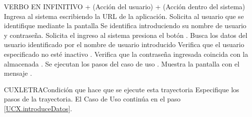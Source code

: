 \begin{UCtrayectoria}
	 VERBO EN INFINITIVO + (Acción del usuario) + (Acción dentro del sistema)
	\UCpaso[\UCactor] Ingresa al sistema escribiendo la URL de la aplicación.
	\UCpaso Solicita al usuario que se identifique mediante la pantalla 
	\UCpaso[\UCactor] \label{UCX.introduceDatos} Se identifica introduciendo su nombre de usuario y contraseña.
	\UCpaso[\UCactor] Solicita el ingreso al sistema presiona el botón .
	\UCpaso Busca los datos del usuario identificado por el nombre de usuario introducido 
	\UCpaso Verifica que el usuario especificado no esté inactivo  .
	\UCpaso Verifica que la contraseña ingresada coincida con la almacenada .
	\UCpaso[] Se ejecutan los pasos del caso de uso .
	\UCpaso Muestra la pantalla  con el mensaje .
\end{UCtrayectoria}


\begin{UCtrayectoriaA}{CUX}{LETRA}{Condición que hace que se ejecute esta trayectoria}
	\UCpaso Especifique los pasos  de la trayectoria.
	\UCpaso[] El Caso de Uso continúa en el paso \ref{UCX.introduceDatos}.
\end{UCtrayectoriaA}


